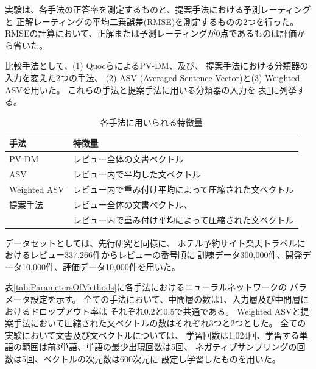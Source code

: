\documentclass[twocolumn,a4paper]{ltjarticle}
\begin{document}
実験は、各手法の正答率を測定するものと、提案手法における予測レーティングと
正解レーティングの平均二乗誤差(RMSE)を測定するものの2つを行った。
RMSEの計算において、正解または予測レーティングが0点であるものは評価から省いた。

比較手法として、(1) Quocら\cite{quoc14}によるPV-DM、及び、
提案手法における分類器の入力を変えた2つの手法、
(2) ASV (Averaged Sentence Vector)と(3) Weighted ASVを用いた。
これらの手法と提案手法に用いる分類器の入力を
表\ref{tab:MethodFeatures}に列挙する。

\begin{table}[b!]
  \caption{各手法に用いられる特徴量}
  \centering
  \begin{tabularx}{\linewidth}{l | X} \label{tab:MethodFeatures}
    手法 & 特徴量 \\
    \hline
    PV-DM & レビュー全体の文書ベクトル \\
    \hline
    ASV & レビュー内で平均した文ベクトル \\
    \hline
    Weighted ASV & レビュー内で重み付け平均によって圧縮された文ベクトル \\
    \hline
    提案手法 & レビュー全体の文書ベクトル、\\
             & レビュー内で重み付け平均によって圧縮された文ベクトル \\
  \end{tabularx}
\end{table}


データセットとしては、先行研究\cite{fujitani15}と同様に、
ホテル予約サイト楽天トラベルにおけるレビュー337,266件からレビューの番号順に
訓練データ300,000件、開発データ10,000件、評価データ10,000件を用いた。


表\ref{tab:ParametersOfMethods}に各手法におけるニューラルネットワークの
パラメータ設定を示す。
全ての手法において、中間層の数は1、入力層及び中間層におけるドロップアウト率は
それぞれ0.2と0.5で共通である。
Weighted ASVと提案手法において圧縮された文ベクトルの数はそれぞれ3つと2つとした。
全ての実験において文書及び文ベクトルについては、
学習回数は1,024回、学習する単語の範囲は前3単語、単語の最少出現回数は5回、
ネガティブサンプリングの回数は5回、ベクトルの次元数は600次元に
設定し学習したものを用いた。
\end{document}
